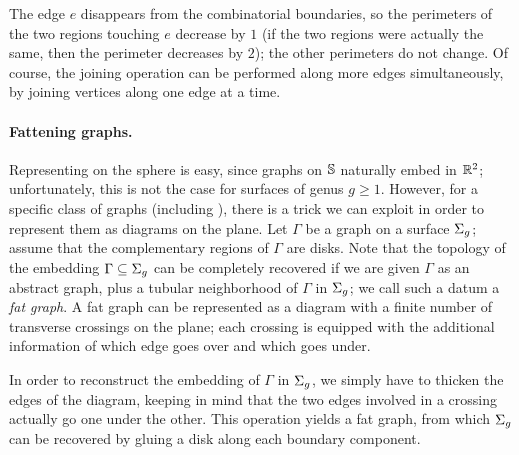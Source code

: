 The edge $e$ disappears from the combinatorial boundaries, so the perimeters of the two regions touching $e$ decrease by $1$ (if the two regions were actually the same, then the perimeter decreases by $2$); the other perimeters do not change. Of course, the joining operation can be performed along more edges simultaneously, by joining vertices along one edge at a time.

\paragraph{Fattening graphs.} Representing \dessins{} on the sphere is easy, since graphs on $\mathbb{S}{}$ naturally embed in $\mathbb{R}^2$; unfortunately, this is not the case for surfaces of genus $g\ge 1$. However, for a specific class of graphs (including \dessins{}), there is a trick we can exploit in order to represent them as diagrams on the plane. Let $\Gamma$ be a graph on a surface $\Sigma_{g}$; assume that the complementary regions of $\Gamma$ are disks. Note that the topology of the embedding $\Gamma\subseteq\Sigma_{g}$ can be completely recovered if we are given $\Gamma$ as an abstract graph, plus a tubular neighborhood of $\Gamma$ in $\Sigma_{g}$; we call such a datum a \emph{fat graph}. A fat graph can be represented as a diagram with a finite number of transverse crossings on the plane; each crossing is equipped with the additional information of which edge goes over and which goes under.

In order to reconstruct the embedding of $\Gamma$ in $\Sigma_{g}$, we simply have to thicken the edges of the diagram, keeping in mind that the two edges involved in a crossing actually go one under the other. This operation yields a fat graph, from which $\Sigma_{g}$ can be recovered by gluing a disk along each boundary component.

